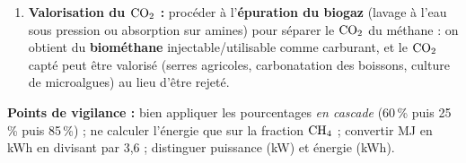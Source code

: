 \documentclass[11pt]{article}
\begin{document}
\begin{corrige}
\begin{enumerate}
\begin{itemize}
\item \textbf{substitution d'engrais} : le digestat riche en azote remplace les engrais minéraux importés (économie de devises, fertilisation des sols agricoles de l'Ouest) et \textbf{assainit la ville} (moins de dépôts sauvages, moins de miasmes et de mouches).
\end{itemize}
\textbf{Risque sanitaire :} un digestat \emph{non hygiénisé} peut contenir des \textbf{agents pathogènes} (coliformes, \emph{Salmonella}, œufs d'helminthes) et des métaux lourds : son épandage brut sur des cultures maraîchères peut contaminer les denrées et les nappes phréatiques. Il faut donc un traitement d'hygiénisation (compostage thermophile, pasteurisation) avant usage.
\item \textbf{Valorisation du $\ce{CO2}$ :} procéder à l'\textbf{épuration du biogaz} (lavage à l'eau sous pression ou absorption sur amines) pour séparer le $\ce{CO2}$ du méthane : on obtient du \textbf{biométhane} injectable/utilisable comme carburant, et le $\ce{CO2}$ capté peut être valorisé (serres agricoles, carbonatation des boissons, culture de microalgues) au lieu d'être rejeté.
\end{enumerate}
\textbf{Points de vigilance :} bien appliquer les pourcentages \emph{en cascade} (60\,\% puis 25\,\% puis 85\,\%) ; ne calculer l'énergie que sur la fraction $\ce{CH4}$ ; convertir MJ en kWh en divisant par 3,6 ; distinguer puissance (kW) et énergie (kWh).
\end{corrige}
\end{document}
